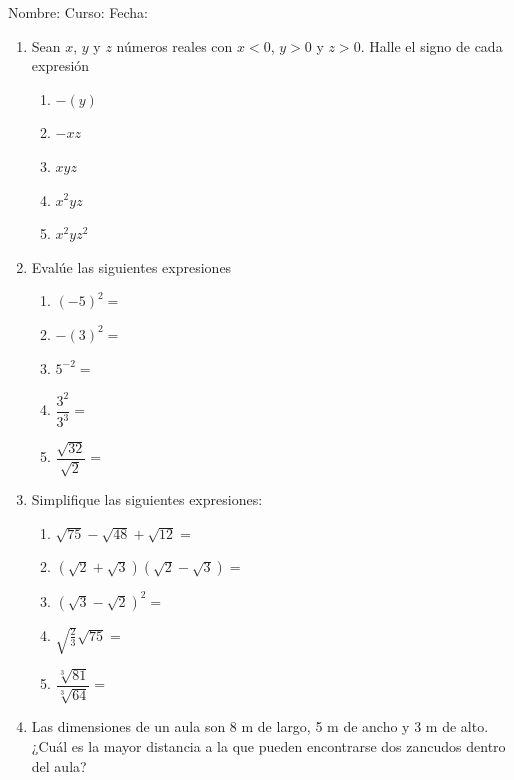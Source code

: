 \documentclass[fleqn]{article}
\newcommand{\LineaNombre}{%
\par
\vspace{\baselineskip}
Nombre:\hrulefill \; Curso: \underline{\hspace*{48pt}} \; Fecha: \underline{\hspace*{2.5cm}} \relax
\par}
\begin{document}
\LineaNombre
\begin{enumerate}
 \item Sean $x$, $y$ y $z$ números reales con $x<0$, $y>0$ y $z>0$. Halle el signo de cada expresión
 \begin{enumerate}
 \item $-(y)$
 \item $-xz$
 \item $xyz$
 \item $x^{2}yz$
 \item $x^{2}yz^{2}$
 \end{enumerate}
 \item Evalúe las siguientes expresiones
 \begin{enumerate}
 \item $(-5)^{2}=$\noanswer
 \item $-(3)^{2}=$\noanswer
 \item $5^{-2}=$\noanswer
 \item $\dfrac{3^{2}}{3^{3}}=$\noanswer
 \item $\dfrac{\sqrt{32}}{\sqrt{2}}=$\noanswer
 \end{enumerate}
 \item Simplifique las siguientes expresiones:
 \begin{enumerate}
 \item $\sqrt{75}-\sqrt{48}+\sqrt{12}=$\vspace*{20pt}
 \item $(\sqrt{2}+\sqrt{3})(\sqrt{2}-\sqrt{3})=$\vspace*{20pt}
 \item $(\sqrt{3}-\sqrt{2})^{2}=$\vspace*{20pt}
 \item $\sqrt{\frac{2}{3}}\sqrt{75}=$ \vspace*{20pt}
 \item $\dfrac{\sqrt[3]{81}}{\sqrt[3]{64}}=$\vspace*{20pt}
 \end{enumerate}
 \item Las dimensiones de un aula son 8 m de largo, 5 m de ancho y 3 m de alto. ¿Cuál es la mayor distancia a la que pueden encontrarse dos zancudos dentro del aula?\noanswer

\end{enumerate}
\end{document}
